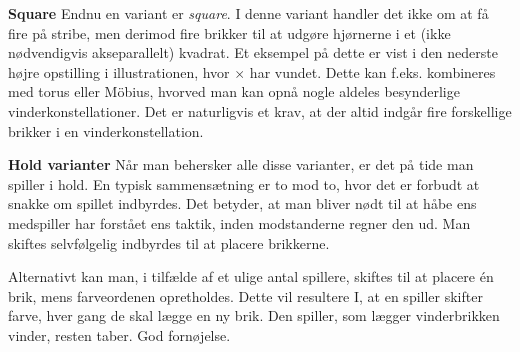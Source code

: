 \noindent\textbf{Square}\newline
Endnu en variant er \textit{square}. I denne variant handler det ikke om at få fire på stribe, men derimod fire brikker til at udgøre hjørnerne i et (ikke nødvendigvis akseparallelt) kvadrat. Et eksempel på dette er vist i den nederste højre opstilling i illustrationen, hvor $\times$ har vundet. Dette kan f.eks. kombineres med torus eller Möbius, hvorved man kan opnå nogle aldeles besynderlige vinderkonstellationer. Det er naturligvis et krav, at der altid indgår fire forskellige brikker i en vinderkonstellation.\newline

\noindent\textbf{Hold varianter}\newline
Når man behersker alle disse varianter, er det på tide man spiller i hold. En typisk sammensætning er to mod to, hvor det er forbudt at snakke om spillet indbyrdes. Det betyder, at man bliver nødt til at håbe ens medspiller har forstået ens taktik, inden modstanderne regner den ud. Man skiftes selvfølgelig indbyrdes til at placere brikkerne.
 
Alternativt kan man, i tilfælde af et ulige antal spillere, skiftes til at placere én brik, mens farveordenen opretholdes. Dette vil resultere I, at en spiller skifter farve, hver gang de skal lægge en ny brik. Den spiller, som lægger vinderbrikken vinder, resten taber. God fornøjelse.

